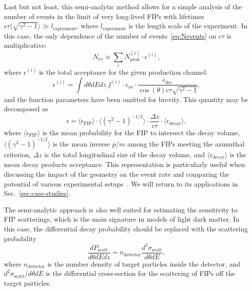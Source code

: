 \documentclass[
    aps,prd,
    twocolumn,
    nofootinbib,
    superscriptaddress,
]{revtex4}
\begin{document}
Last but not least, this semi-analytic method allows for a simple analysis of the number of events in the limit of very long-lived FIPs with lifetimes $c\tau\langle \sqrt{\gamma^{2}-1}\rangle\gg l_{\text{experiment}}$, where $l_{\text{experiment}}$ is the length scale of the experiment. In this case, the only dependence of the number of events~\eqref{eq:Nevents} on $c\tau$ is multiplicative:
\begin{equation}
    N_{\text{ev}} \approx \sum_{i}N_{\text{prod}}^{(i)}\cdot \epsilon^{(i)},
    \label{eq:number-of-events-large-lifetimes}
\end{equation}
where $\epsilon^{(i)}$ is the total acceptance for the given production channel:
\begin{equation}
    \epsilon^{(i)} = \int d\theta dE dz\ f^{(i)}\cdot \epsilon_{\text{az}}\cdot \frac{\epsilon_{\text{dec}}}{\cos(\theta)c\tau\sqrt{\gamma^{2}-1}},
    \label{eq:total-acceptance}
\end{equation}
and the function parameters have been omitted for brevity.
This quantity may be decomposed as
\begin{equation}
    \epsilon = \langle \epsilon_{\text{FIP}}\rangle\cdot \langle (\gamma^{2}-1)^{-1/2}\rangle\cdot \frac{\Delta z}{c\tau}\cdot \langle \epsilon_{\text{decay}}\rangle,
\end{equation}
where $\langle \epsilon_{\text{FIP}}\rangle$ is the mean probability for the FIP to intersect the decay volume, $\langle (\gamma^{2}-1)^{-1/2}\rangle$ is the mean inverse $p/m$ among the FIPs meeting the azimuthal criterion, $\Delta z$ is the total longitudinal size of the decay volume, and $\langle \epsilon_{\text{decay}}\rangle$ is the mean decay products acceptance. This representation is particularly useful when discussing the impact of the geometry on the event rate and comparing the potential of various experimental setups~\cite{Bondarenko:2019yob,Bondarenko:2023fex}. We will return to its applications in Sec.~\ref{sec:case-studies}.

The semi-analytic approach is also well suited for estimating the sensitivity to FIP scatterings, which is the main signature in models of light dark matter. In this case, the differential decay probability should be replaced with the scattering probability 
\begin{equation}
\frac{dP_{\text{scatt}}}{d\theta dEdz} = n_{\text{detector}}\frac{d^{2}\sigma_{\text{scatt}}}{d\theta dE},
\end{equation}
where $n_{\text{detector}}$ is the number density of target particles inside the detector, and $d^{2}\sigma_{\text{scatt}}/d\theta dE$ is the differential cross-section for the scattering of FIPs off the target particles.
\end{document}
